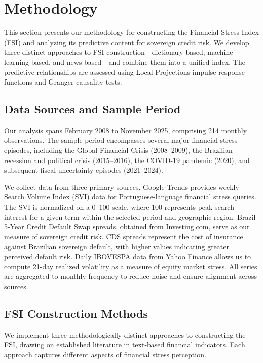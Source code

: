 
\section{Methodology}\label{sec:methodology}

This section presents our methodology for constructing the Financial Stress Index (FSI) and analyzing its predictive content for sovereign credit risk. We develop three distinct approaches to FSI construction---dictionary-based, machine learning-based, and news-based---and combine them into a unified index. The predictive relationships are assessed using Local Projections impulse response functions and Granger causality tests.

\subsection{Data Sources and Sample Period}

Our analysis spans February 2008 to November 2025, comprising 214 monthly observations. The sample period encompasses several major financial stress episodes, including the Global Financial Crisis (2008--2009), the Brazilian recession and political crisis (2015--2016), the COVID-19 pandemic (2020), and subsequent fiscal uncertainty episodes (2021--2024).

We collect data from three primary sources. Google Trends provides weekly Search Volume Index (SVI) data for Portuguese-language financial stress queries. The SVI is normalized on a 0--100 scale, where 100 represents peak search interest for a given term within the selected period and geographic region. Brazil 5-Year Credit Default Swap spreads, obtained from Investing.com, serve as our measure of sovereign credit risk. CDS spreads represent the cost of insurance against Brazilian sovereign default, with higher values indicating greater perceived default risk. Daily IBOVESPA data from Yahoo Finance allows us to compute 21-day realized volatility as a measure of equity market stress. All series are aggregated to monthly frequency to reduce noise and ensure alignment across sources.

\subsection{FSI Construction Methods}

We implement three methodologically distinct approaches to constructing the FSI, drawing on established literature in text-based financial indicators. Each approach captures different aspects of financial stress perception.

